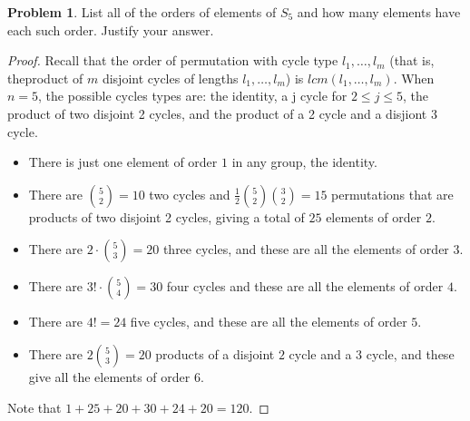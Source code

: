 \documentclass[11pt]{article}
\theoremstyle{definition}
\newtheorem{problem}{Problem}
\begin{document}
\begin{problem}
List all of the orders of elements of $S_5$ and how many elements have each such order. Justify your answer.
\end{problem}

\begin{proof}
Recall that the order of permutation with cycle type $l_1, \dots, l_m$ (that is, theproduct of $m$ disjoint cycles of lengths $l_1, \dots, l_m$) is $lcm(l_1, \dots,
  l_m)$. When $n = 5$, the possible cycles types are: the identity, a j cycle for $2 \leq j \leq 5$, the product of two disjoint 2 cycles, and the product of a 2 cycle and a
  disjiont 3 cycle.
  \begin{itemize}
  \item There is just one element of order $1$ in any group, the identity.
    \item There are ${5 \choose 2} = 10$ two cycles and $\frac12 {5 \choose 2} {3 \choose 2} = 15$ permutations that are products 
      of two disjoint 2 cycles, giving a total of $25$ elements of order $2$.
    \item There are $2 \cdot {5 \choose 3} = 20$ three cycles, and these are all the elements of order $3$.
      \item There are
        $3! \cdot {5 \choose 4} = 30$ four cycles and these are all the elements of order $4$.
        \item There are $4! = 24$ five cycles, and these are all the elements of order $5$.
\item There are $2 {5 \choose 3} = 20$ products of a disjoint $2$ cycle and a $3$ cycle, and these give all the elements of order $6$.
\end{itemize}
Note that $1 + 25 + 20 + 30 + 24 + 20 = 120$.
\end{proof}
\end{document}
